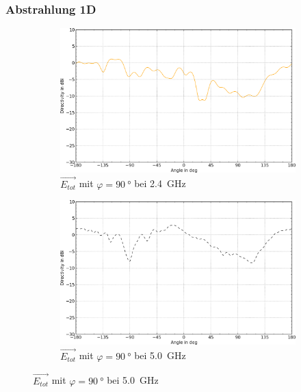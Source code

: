 \clearpage
\subsubsection{Abstrahlung 1D}


\begin{figure}[h!]
	\centering
	\begin{subfigure}[b]{0.48\textwidth}
		\includegraphics[width=1\textwidth]{../fig/plt/crazy_stuff_l4_pcb_v2c_laptop_1a_105_2ghz4_eabs_phi90-trim.png}
		\caption{$\vec{E_{tot}}$ mit $\varphi=\SI{90}{\degree}$ bei \SI{2.4}{\giga\hertz}}
	\end{subfigure}
	\begin{subfigure}[b]{0.48\textwidth}
		\includegraphics[width=1\textwidth]{../fig/plt/crazy_stuff_l4_pcb_v2c_laptop_1a_105_5ghz0_eabs_phi90-trim.png}
		\caption{$\vec{E_{tot}}$ mit $\varphi=\SI{90}{\degree}$ bei \SI{5.0}{\giga\hertz}}
	\end{subfigure}


\end{figure}
